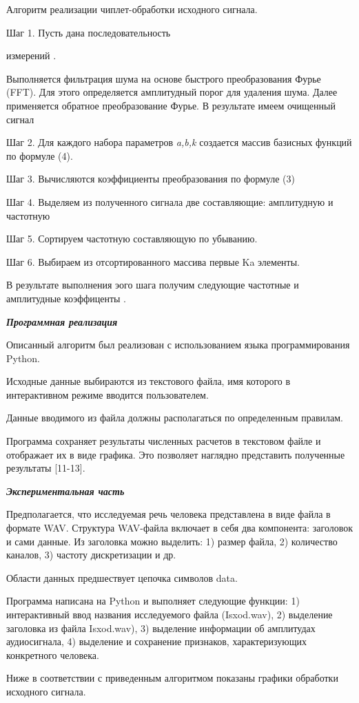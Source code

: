 \begin{multicols}{2}
Алгоритм реализации чиплет-обработки исходного сигнала.

Шаг 1. Пусть дана последовательность

измерений
.

Выполняется фильтрация шума на основе быстрого преобразования Фурье
(FFT). Для этого определяется амплитудный порог для удаления шума. Далее
применяется обратное преобразование Фурье. В результате имеем очищенный
сигнал

Шаг 2. Для каждого набора параметров \emph{a,b,k} создается массив
базисных функций
по
формуле (4).

Шаг 3. Вычисляются коэффициенты преобразования по формуле (3)

Шаг 4. Выделяем из полученного сигнала две составляющие: амплитудную и
частотную

Шаг 5. Сортируем частотную составляющую по убыванию.

Шаг 6. Выбираем из отсортированного массива первые Ka элементы.

В результате выполнения эого шага получим следующие частотные и
амплитудные коэффиценты
.

\emph{{\bfseries Программная реализация}}

Описанный алгоритм был реализован с использованием языка
программирования Python.

Исходные данные выбираются из текстового файла, имя которого в
интерактивном режиме вводится пользователем.

Данные вводимого из файла должны располагаться по определенным правилам.

Программа сохраняет результаты численных расчетов в текстовом файле и
отображает их в виде графика. Это позволяет наглядно представить
полученные результаты {[}11-13{]}.

\emph{{\bfseries Экспериментальная часть}}

Предполагается, что исследуемая речь человека представлена в виде файла
в формате WAV. Структура WAV-файла включает в себя два компонента:
заголовок и сами данные. Из заголовка можно выделить: 1) размер файла,
2) количество каналов, 3) частоту дискретизации и др.

Области данных предшествует цепочка символов data.

Программа написана на Python и выполняет следующие функции: 1)
интерактивный ввод названия исследуемого файла (Isxod.wav), 2) выделение
заголовка из файла Isxod.wav), 3) выделение информации об амплитудах
аудиосигнала, 4) выделение и сохранение признаков, характеризующих
конкретного человека.

Ниже в соответствии с приведенным алгоритмом показаны графики обработки
исходного сигнала.
\end{multicols}


